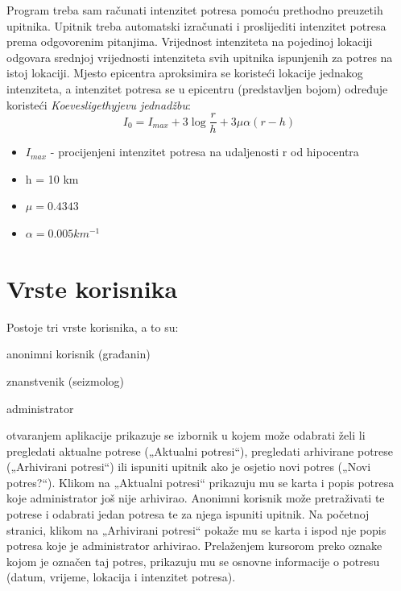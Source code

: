 	Program treba sam računati intenzitet potresa pomoću prethodno preuzetih upitnika. Upitnik treba automatski izračunati i proslijediti intenzitet potresa prema odgovorenim pitanjima. Vrijednost intenziteta na pojedinoj lokaciji odgovara srednjoj vrijednosti intenziteta svih upitnika ispunjenih za potres na istoj lokaciji. Mjesto epicentra aproksimira se koristeći lokacije jednakog intenziteta, a intenzitet potresa se u epicentru (predstavljen bojom) određuje koristeći \textit{Koevesligethyjevu jednadžbu}:
\begin{equation}
  I_{0} = I_{max} + 3\log\frac{r}{h} + 3\mu\alpha(r-h)
\end{equation}

\begin{itemize}                                                             
    \item $I_{max}$ - procijenjeni intenzitet potresa na udaljenosti r od hipocentra
    \item h = 10 km 
    \item $\mu=0.4343$
    \item $\alpha=0.005 km^{-1}$
    
\end{itemize} 


\section{Vrste korisnika}
Postoje tri vrste korisnika, a to su:
\begin{packed_item}
	\item anonimni korisnik (građanin)
	\item znanstvenik (seizmolog)
	\item administrator
\end{packed_item}

 otvaranjem aplikacije prikazuje se izbornik u kojem može odabrati želi li pregledati aktualne potrese („Aktualni potresi“), pregledati arhivirane potrese („Arhivirani potresi“) ili ispuniti upitnik ako je osjetio novi potres („Novi potres?“). Klikom na „Aktualni potresi“ prikazuju mu se karta i popis potresa koje administrator još nije arhivirao. Anonimni korisnik može pretraživati te potrese i odabrati jedan potresa te za njega ispuniti upitnik. Na početnoj stranici, klikom na „Arhivirani potresi“ pokaže mu se karta i ispod nje popis potresa koje je administrator arhivirao. Prelaženjem kursorom preko oznake kojom je označen taj potres, prikazuju mu se osnovne informacije o potresu (datum, vrijeme, lokacija i intenzitet potresa).

